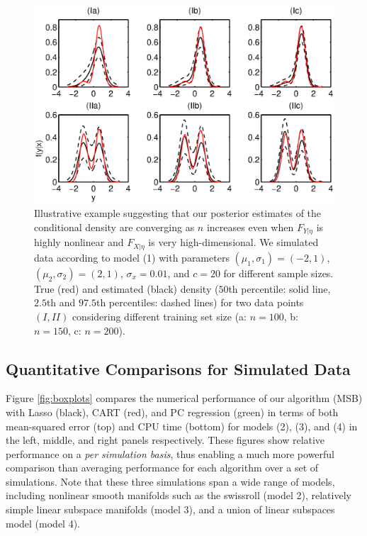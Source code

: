 \documentclass{article} %
\begin{document}
\begin{figure}[h!]
\centering
 \vskip -10pt 
\includegraphics[width=120mm]{../figs/ch3_density.eps}
 \vskip -15pt 
\caption{Illustrative example suggesting that our posterior estimates of the conditional density are converging as $n$ increases even when $F_{Y|\eta}$ is highly nonlinear and $F_{X|\eta}$ is very high-dimensional.  We simulated data according to model (1) with parameters $(\mu_1,\sigma_1)=(-2,1)$, $(\mu_2,\sigma_2)=(2,1)$, $\sigma_x=0.01$, and $c=20$ for different sample sizes. True (red) and estimated (black) density ($50$th percentile: solid line, $2.5$th and $97.5$th percentiles: dashed lines) for two data points $(I, II)$ considering different training set size (a: $n=100$, b: $n=150$, c: $n=200$). } \label{plotDensity}
\end{figure}




\subsection{Quantitative Comparisons for Simulated Data} \label{sub:sim}

Figure \ref{fig:boxplots} compares the numerical performance of our algorithm (MSB) with Lasso (black), CART (red), and PC regression (green) in terms of both mean-squared error (top) and CPU time (bottom) for models (2), (3), and (4) in the left, middle, and right panels respectively. These figures show relative performance on a \emph{per simulation basis}, thus enabling a much more powerful comparison than averaging performance for each algorithm over a set of simulations.  Note that these three simulations span a wide range of models, including
nonlinear smooth manifolds such as the swissroll (model 2),
relatively simple linear subspace manifolds (model 3), 
and a union of linear subspaces model (model 4).
\end{document}
